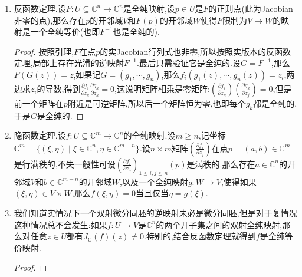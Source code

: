 \begin{enumerate}
\begin{proof}
		如果从微分形式的角度看,取$\Omega=\mathrm{d}x^1\wedge\mathrm{d}y^1\wedge\cdots\wedge\mathrm{d}x^n\wedge\mathrm{d}y^n=\left(\frac{\sqrt{-1}}{2}\right)^n\mathrm{d}z_1\wedge\mathrm{d}\overline{z_1}\wedge\cdots\wedge\mathrm{d}z_n\wedge\mathrm{d}\overline{z_n}$.考虑回拉$f^*$,按照定义有:
		\begin{align*}
			J_{\mathbb{R}}(f)\Omega=f^*\omega&=\pm\left(\frac{\sqrt{-1}}{2}\right)^nf^*(\mathrm{d}z_1\wedge\cdots\wedge\mathrm{d}z_n)\wedge f^*(\mathrm{d}\overline{z_1}\wedge\cdots\wedge\mathrm{d}\overline{z_n})\\&=\left(\frac{\sqrt{-1}}{2}\right)^n(\mathrm{d}f_1\wedge\cdots\wedge\mathrm{d}f_n)\wedge(\mathrm{d}\overline{f_1}\wedge\cdots\wedge\mathrm{d}\overline{f_n})\\&=\pm\left(\frac{\sqrt{-1}}{2}\right)^nJ_{\mathbb{C}}(f)\overline{J_{\mathbb{C}}(f)}\mathrm{d}z_1\wedge\cdots\wedge\mathrm{d}z_n\wedge\mathrm{d}\overline{z_1}\wedge\cdots\wedge\mathrm{d}\overline{z_n}\\&=\left(\frac{\sqrt{-1}}{2}\right)^n|J_{\mathbb{C}}(f)|^2\mathrm{d}z_1\wedge\mathrm{d}\overline{z_1}\wedge\cdots\wedge\mathrm{d}z_n\wedge\mathrm{d}\overline{z_n}\\&=|J_{\mathbb{C}}(f)|^2\Omega
		\end{align*}
	\end{proof}
	\item 反函数定理.设$F:U\subseteq\mathbb{C}^n\to\mathbb{C}^n$是全纯映射,设$p\in U$是$F$的正则点(此为Jacobian非零的点),那么存在$p$的开邻域$V$和$F(p)$的开邻域$W$使得$F$限制为$V\to W$的映射是一个全纯等价(也即$F^{-1}$也是全纯的).
	\begin{proof}
		
		按照引理,$F$在点$p$的实Jacobian行列式也非零,所以按照实版本的反函数定理,局部上存在光滑的逆映射$F^{-1}$.最后只需验证它是全纯的.设$G=F^{-1}$,那么$F(G(z))=z$,如果记$G=(g_1,\cdots,g_n)$,那么$f_i(g_1(z),\cdots,g_n(z))=z_i$,两边求$\overline{z_i}$的导数,得到$\frac{\partial f_i}{\partial z_k}\frac{\partial g_k}{\partial\overline{z_k}}=0$,这说明矩阵相乘是零矩阵:$\left(\frac{\partial f_i}{\partial z_k}\right)\left(\frac{\partial g_k}{\partial\overline{z_j}}\right)=0$,但是前一个矩阵在$p$附近是可逆矩阵,所以后一个矩阵恒为零,也即每个$g_k$都是全纯的,于是$G$是全纯的.
	\end{proof}
    \item 隐函数定理.设$f:U\subseteq\mathbb{C}^m\to\mathbb{C}^n$的全纯映射.设$m\ge n$,记坐标$\mathbb{C}^m=\{(\xi,\eta)\mid\xi\in\mathbb{C}^n,\eta\in\mathbb{C}^{m-n}\}$.设$n\times m$矩阵$\left(\frac{\partial f_i}{\partial z_j}\right)$在点$p=(a,b)\in\mathbb{C}^m$是行满秩的,不失一般性可设$\left(\frac{\partial f_i}{\partial z_j}\right)_{1\le i,j\le n}(p)$是满秩的.那么存在$a\in\mathbb{C}^n$的开邻域$V$和$b\in\mathbb{C}^{m-n}$的开邻域$W$,以及一个全纯映射$g:W\to V$,使得如果$(\xi,\eta)\in V\times W$,那么$f(\xi,\eta)=0$当且仅当$\eta=g(\xi)$.
    \item 我们知道实情况下一个双射微分同胚的逆映射未必是微分同胚,但是对于复情况这种情况总不会发生:如果$f:U\to V$是$\mathbb{C}^n$的两个开子集之间的双射全纯映射,那么对任意$z\in U$都有$J_{\mathbb{C}}(f)(z)\not=0$.特别的,结合反函数定理就得到$f$是全纯等价映射.
    \begin{proof}
    	

\end{proof}
\end{enumerate}
